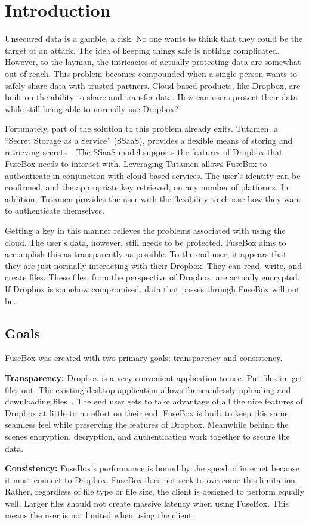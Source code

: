 \documentclass[11pt,twocolumn,letterpaper]{article}
\newcommand{\appname}{FuseBox }
\newcommand{\appnameWOspace}{FuseBox}
\newcommand{\custos}{Tutamen }
\newcommand{\custosWOspace}{Tutamen}
\begin{document}
\section{Introduction}
\label{sec:intro}
Unsecured data is a gamble, a risk. No one wants to think that
they could be the target of an attack. The idea of keeping things safe
is nothing complicated. However, to the layman, the intricacies of
actually protecting data are somewhat out of reach. This problem
becomes compounded when a single person wants to safely share data
with trusted partners. Cloud-based products, like Dropbox, are built
on the ability to share and transfer data. How can users protect their
data while still being able to normally use Dropbox? 
\par Fortunately, part of the solution to this problem already exits.
\custosWOspace, a ``Secret Storage as a Service'' (SSaaS), 
provides a flexible means of storing and
retrieving secrets~\cite{custostrios}. The SSaaS model supports the features of
Dropbox that \appname needs to interact with. Leveraging \custos allows \appname to 
authenticate in conjunction with cloud based services. The user's
identity can be confirmed, and the appropriate key retrieved, on any number
of platforms. In addition, \custos provides the user with the 
flexibility to choose how they want to authenticate themselves. 
\par Getting a key in this manner relieves the problems associated
with using the cloud. The user's data, however, still needs to be
protected. \appname aims to accomplish this as transparently as
possible. To the end user, it appears that they are just normally
interacting with their Dropbox. They can read, write, and create
files. These files, from the perspective of Dropbox, are actually
encrypted. If Dropbox is somehow compromised, data that passes through \appname
will not be.    

\subsection{Goals}
\label{sec:goals}
\appname was created with two primary goals: transparency and consistency. 
\par {\bf Transparency:} Dropbox is a very convenient application to
use. Put files in, get files out. The existing desktop application
allows for seamlessly uploading and downloading files~\cite{dropboxclient}. The end user
gets to take advantage of all the nice features of Dropbox at little
to no effort on their end. \appname is built to keep this same 
seamless feel while preserving the features of Dropbox. Meanwhile behind the
scenes encryption, decryption, and authentication work together to
secure the data.     
\par {\bf Consistency:} \appnameWOspace's performance is bound by
the speed of internet because it must connect to Dropbox. 
\appname does not seek to overcome this
limitation. Rather, regardless of file type or file size, the client
is designed to perform equally well. Larger files should not create
massive latency when using \appnameWOspace. This means the user is not
limited when using the client.    
\end{document}
